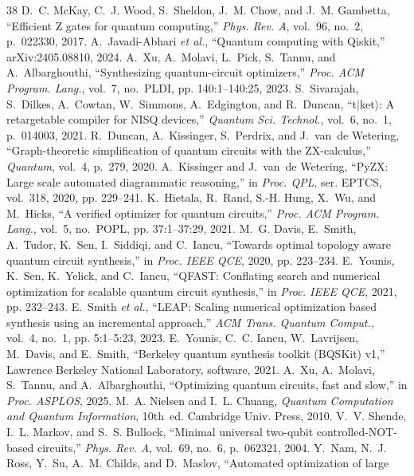 \documentclass[conference,letterpaper]{IEEEtran}
\begin{document}
\begin{thebibliography}{38}
\footnotesize
{} D.~C. McKay, C.~J. Wood, S.~Sheldon, J.~M. Chow, and J.~M. Gambetta, ``Efficient Z gates
for quantum computing,'' \emph{Phys. Rev. A}, vol.~96, no.~2, p.~022330, 2017.
 A.~Javadi-Abhari \emph{et al.}, ``Quantum computing with Qiskit,'' arXiv:2405.08810, 2024.
 A.~Xu, A.~Molavi, L.~Pick, S.~Tannu, and A.~Albarghouthi, ``Synthesizing quantum-circuit
optimizers,'' \emph{Proc. ACM Program. Lang.}, vol.~7, no.~PLDI, pp. 140:1--140:25, 2023.
 S.~Sivarajah, S.~Dilkes, A.~Cowtan, W.~Simmons, A.~Edgington, and R.~Duncan, ``t$|$ket$\rangle$:
A retargetable compiler for NISQ devices,'' \emph{Quantum Sci. Technol.}, vol.~6, no.~1, p.~014003, 2021.
 R.~Duncan, A.~Kissinger, S.~Perdrix, and J.~van~de Wetering, ``Graph-theoretic
simplification of quantum circuits with the ZX-calculus,'' \emph{Quantum}, vol.~4, p.~279, 2020.
 A.~Kissinger and J.~van~de Wetering, ``PyZX: Large scale automated diagrammatic reasoning,'' in
\emph{Proc. QPL}, ser. EPTCS, vol.~318, 2020, pp. 229--241.
 K.~Hietala, R.~Rand, S.-H. Hung, X.~Wu, and M.~Hicks, ``A verified optimizer for quantum
circuits,'' \emph{Proc. ACM Program. Lang.}, vol.~5, no.~POPL, pp. 37:1--37:29, 2021.
 M.~G. Davis, E.~Smith, A.~Tudor, K.~Sen, I.~Siddiqi, and C.~Iancu, ``Towards optimal
topology aware quantum circuit synthesis,'' in \emph{Proc. IEEE QCE}, 2020, pp. 223--234.
 E.~Younis, K.~Sen, K.~Yelick, and C.~Iancu, ``QFAST: Conflating search and numerical
optimization for scalable quantum circuit synthesis,'' in \emph{Proc. IEEE QCE}, 2021, pp. 232--243.
 E.~Smith \emph{et al.}, ``LEAP: Scaling numerical optimization based synthesis using an
incremental approach,'' \emph{ACM Trans. Quantum Comput.}, vol.~4, no.~1, pp. 5:1--5:23, 2023.
 E.~Younis, C.~C. Iancu, W.~Lavrijsen, M.~Davis, and E.~Smith, ``Berkeley quantum synthesis
toolkit (BQSKit) v1,'' Lawrence Berkeley National Laboratory, software, 2021.
 A.~Xu, A.~Molavi, S.~Tannu, and A.~Albarghouthi, ``Optimizing quantum circuits, fast and
slow,'' in \emph{Proc. ASPLOS}, 2025.
 M.~A. Nielsen and I.~L. Chuang, \emph{Quantum Computation and Quantum Information}, 10th~ed.
Cambridge Univ. Press, 2010.
 V.~V. Shende, I.~L. Markov, and S.~S. Bullock, ``Minimal universal two-qubit
controlled-NOT-based circuits,'' \emph{Phys. Rev. A}, vol.~69, no.~6, p.~062321, 2004.
 Y.~Nam, N.~J. Ross, Y.~Su, A.~M. Childs, and D.~Maslov, ``Automated optimization of large

\end{thebibliography}
\end{document}
